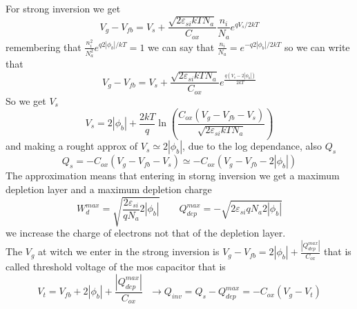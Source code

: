 \vspace{5mm}
For strong inversion we get 
\begin{equation}
V_g-V_{fb}=V_s+\frac{\sqrt{2\varepsilon_{si}kTN_a}}{C_{ox}}\frac{n_i}{N_a}e^{qV_s/2kT}
\end{equation}
remembering that $\frac{n_i^2}{N_a^2}e^{q2|\phi_b|/kT}=1$ we can say that $\frac{n_i}{N_a}=e^{-q2|\phi_b|/2kT}$ so we can write that 
\begin{equation}
V_g-V_{fb}=V_s+\frac{\sqrt{2\varepsilon_{si}kTN_a}}{C_{ox}}e^{\frac{q(V_s-2|\phi_b|)}{2kT}}
\end{equation}
So we get $V_s$ 
\begin{equation}
V_s=2|\phi_b|+\frac{2kT}{q}\ln \left(\frac{C_{ox}(V_g-V_{fb}-V_s)}{\sqrt{2\varepsilon_{si}kTN_a}} \right) 
\end{equation}
and making a rought approx of $V_s\simeq 2|\phi_b|$, due to the log dependance, also $Q_s$\\
\begin{equation}
Q_s=-C_{ox}(V_g-V_{fb}-V_s)\simeq-C_{ox}(V_g-V_{fb}-2|\phi_b|)
\end{equation}
The approximation means that entering in storng inversion we get a maximum depletion layer and a maximum depletion charge
\begin{equation}
W_d^{max}=\sqrt{\frac{2\varepsilon_{si}}{qN_a}2|\phi_b|} \ \ \ \ \ \ \ \ \ Q_{dep}^{max}=-\sqrt{2\varepsilon_{si}qN_a2|\phi_b|}
\end{equation}
we increase the charge of electrons not that of the depletion layer.\\
The $V_g$ at witch we enter in the strong inversion is $V_g-V_{fb}=2|\phi_b|+\frac{|Q_{dep}^{max}|}{C_{ox}}$ that is called threshold voltage of the mos capacitor that is 
\begin{equation}
V_t=V_{fb}+2|\phi_b|+\frac{|Q_{dep}^{max}|}{C_{ox}} \ \ \ \rightarrow Q_{inv}=Q_s-Q_{dep}^{max}=-C_{ox}(V_g-V_t)
\end{equation}

